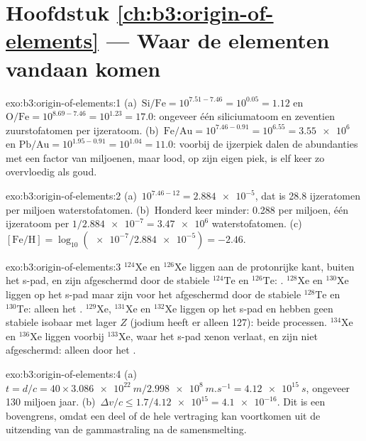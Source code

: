 \section*{Hoofdstuk \ref{ch:b3:origin-of-elements} --- Waar de elementen vandaan komen}

\begin{solution}{exo:b3:origin-of-elements:1}
(a)~$\mathrm{Si/Fe} = 10^{7.51 - 7.46} = 10^{0.05} = 1.12$ en
$\mathrm{O/Fe} = 10^{8.69 - 7.46} = 10^{1.23} = 17.0$: ongeveer één siliciumatoom
en zeventien zuurstofatomen per ijzeratoom. (b)~$\mathrm{Fe/Au} =
10^{7.46 - 0.91} = 10^{6.55} = \num{3.55e6}$ en $\mathrm{Pb/Au} =
10^{1.95 - 0.91} = 10^{1.04} = 11.0$: voorbij de ijzerpiek dalen de abundanties
met een factor van miljoenen, maar lood, op zijn eigen piek, is elf keer zo
overvloedig als goud.
\end{solution}

\begin{solution}{exo:b3:origin-of-elements:2}
(a)~$10^{7.46 - 12} = \num{2.884e-5}$, dat is \num{28.8} ijzeratomen per
miljoen waterstofatomen. (b)~Honderd keer minder: \num{0.288} per
miljoen, één ijzeratoom per $1/\num{2.884e-7} = \num{3.47e6}$
waterstofatomen. (c)~$[\mathrm{Fe/H}] = \log_{10}(\num{e-7}/\num{2.884e-5}) =
-2.46$.
\end{solution}

\begin{solution}{exo:b3:origin-of-elements:3}
$^{124}\mathrm{Xe}$ en $^{126}\mathrm{Xe}$ liggen aan de protonrijke kant,
buiten het s-pad, en zijn afgeschermd door de stabiele $^{124}\mathrm{Te}$ en
$^{126}\mathrm{Te}$: . $^{128}\mathrm{Xe}$ en $^{130}\mathrm{Xe}$
liggen op het s-pad maar zijn voor het  afgeschermd door de stabiele
$^{128}\mathrm{Te}$ en $^{130}\mathrm{Te}$: alleen het . $^{129}\mathrm{Xe}$,
$^{131}\mathrm{Xe}$ en $^{132}\mathrm{Xe}$ liggen op het s-pad en hebben geen stabiele
isobaar met lager $Z$ (jodium heeft er alleen 127): beide processen.
$^{134}\mathrm{Xe}$ en $^{136}\mathrm{Xe}$ liggen voorbij
$^{133}\mathrm{Xe}$, waar het s-pad xenon verlaat, en zijn niet
afgeschermd: alleen door het .
\end{solution}

\begin{solution}{exo:b3:origin-of-elements:4}
(a)~$t = d/c = 40\times\qty{3.086e22}{m}/\qty{2.998e8}{m.s^{-1}} =
\qty{4.12e15}{s}$, ongeveer \num{130} miljoen jaar. (b)~$\Delta v/c \le
1.7/\num{4.12e15} = \num{4.1e-16}$. Dit is een bovengrens, omdat een deel of
de hele vertraging kan voortkomen uit de uitzending van de gammastraling na de
samensmelting.
\end{solution}

